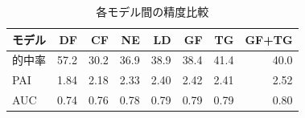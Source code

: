 \begin{table}[htbp]
  \centering
  \caption{各モデル間の精度比較}
  \begin{tabular}{l|r|r|r|r|r|r|r}
  \hline

  モデル & DF & CF & NE & LD & GF & TG & GF+TG \\  \hline\hline
  的中率 & 57.2 & 30.2 & 36.9 & 38.9 & 38.4 & 41.4 & 40.0 \\ 
  PAI & 1.84 & 2.18 & 2.33 & 2.40 & 2.42 & 2.41 & 2.52 \\ 
  AUC & 0.74 & 0.76 & 0.78 & 0.79 & 0.79 & 0.79 & 0.80 \\ \hline
  


  \end{tabular}
  \label{tb:fig:non-crime-timeseries-index}
\end{table}

\FloatBarrier